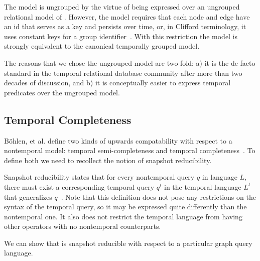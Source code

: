 The \tg model is ungrouped by the virtue of being expressed over an
ungrouped relational model of \tra.  However, the \tg model requires
that each node and edge have an id that serves as a key and persists
over time, or, in Clifford terminology, it uses constant keys for a
group identifier~\cite{Clifford1994}.  With this restriction the \tga
model is strongly equivalent to the canonical temporally grouped model.

The reasons that we chose the ungrouped model are two-fold: a) it is
the de-facto standard in the temporal relational database community
after more than two decades of discussion, and b) it is conceptually
easier to express temporal predicates over the ungrouped model.

\subsection{Temporal Completeness}
\label{sec:formal:reducible}

B{\"{o}}hlen, et al. define two kinds of upwards
  compatability with respect to a nontemporal model: temporal
  semi-completeness and temporal completeness~\cite{Bohlen1995}.  To
  define both we need to recollect the notion of snapshot reducibility.

Snapshot reducibility states that for every nontemporal query $q$ in
language $L$, there must exist a corresponding temporal query $q^t$ in
the temporal language $L^t$ that generalizes $q$~\cite{Dignos2012}.
Note that this definition does not pose any restrictions on the syntax
of the temporal query, so it may be expressed quite differently than
the nontemporal one.  It also does not restrict the temporal language
from having other operators with no nontemporal counterparts.

We can show that \tga is snapshot reducible with respect to
  a particular graph query language.

%

